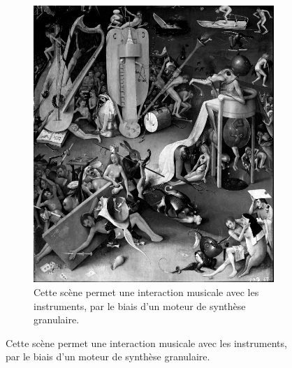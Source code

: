 \begin{subfigure}[t]{0.45\textwidth}
\begin{subfigure}[t]{\textwidth}
    \centering
    \includegraphics[width=\textwidth]{images/C3.png}
    \caption{Cette scène permet une interaction musicale avec les instruments, par le biais d'un moteur de synthèse granulaire.}
    \label{fig.C3}
\end{subfigure}
\end{subfigure}